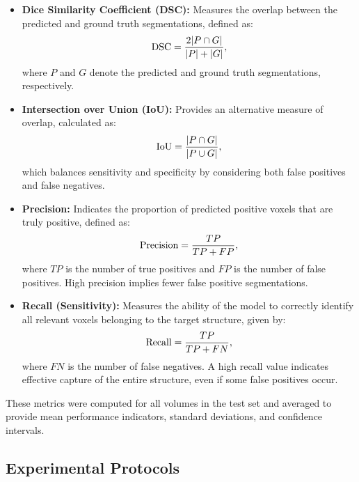 \begin{itemize}
\item \textbf{Dice Similarity Coefficient (DSC):} Measures the overlap between the predicted and ground truth segmentations, defined as:
\begin{equation}
\addcontentsline{equ}{equations}{\protect\numberline{\theequation}Dice Coefficient}
\text{DSC} = \frac{2|P \cap G|}{|P| + |G|},
\end{equation}
where $P$ and $G$ denote the predicted and ground truth segmentations, respectively.
\item \textbf{Intersection over Union (IoU):} Provides an alternative measure of overlap, calculated as:
\begin{equation}
\addcontentsline{equ}{equations}{\protect\numberline{\theequation}Intersection over Union (IoU)}
\text{IoU} = \frac{|P \cap G|}{|P \cup G|},
\end{equation}
which balances sensitivity and specificity by considering both false positives and false negatives.
\item \textbf{Precision:} Indicates the proportion of predicted positive voxels that are truly positive, defined as:
\begin{equation}
\addcontentsline{equ}{equations}{\protect\numberline{\theequation}Precision}
\text{Precision} = \frac{TP}{TP + FP},
\end{equation}
where $TP$ is the number of true positives and $FP$ is the number of false positives. High precision implies fewer false positive segmentations.
\item \textbf{Recall (Sensitivity):} Measures the ability of the model to correctly identify all relevant voxels belonging to the target structure, given by:
\begin{equation}
\addcontentsline{equ}{equations}{\protect\numberline{\theequation}Recall}
\text{Recall} = \frac{TP}{TP + FN},
\end{equation}
where $FN$ is the number of false negatives. A high recall value indicates effective capture of the entire structure, even if some false positives occur.
\end{itemize}
These metrics were computed for all volumes in the test set and averaged to provide mean performance indicators, standard deviations, and confidence intervals.

\subsection{Experimental Protocols}

